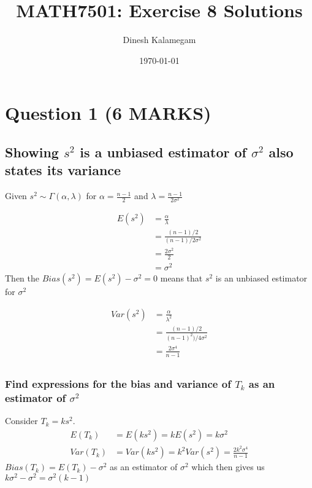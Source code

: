 \documentclass[11pt]{article}
\begin{document}
\title{MATH7501: Exercise 8 Solutions}
\author{Dinesh Kalamegam}
\date{\today}
\maketitle

\renewcommand\qedsymbol{\textbf{\emph{Quod Erat Demonstrandum}}}
\setlength{\parindent}{0pt}
\setlength{\parskip}{\baselineskip}
\newtheorem{theorem}{Theorem}[section]
\newtheorem{definition}[theorem]{Defintion}
\newtheorem{proposition}[theorem]{Proposition}
\newtheorem{corollary}[theorem]{Corollary}

\section{Question 1 (6 MARKS)}
\subsection{Showing $s^{2}$ is a unbiased estimator of $\sigma^{2}$ also states its variance}
Given $s^{2} \sim \Gamma(\alpha,\lambda)$ for $\alpha = \frac{n-1}{2}$ and $\lambda=\frac{n-1}{2\sigma^{2}}$

\begin{align*}
  E(s^{2}) &=  \frac{\alpha}{\lambda} \\
           &=  \frac{(n-1)/2}{(n-1)/2 \sigma^{2}} \\
           &=  \frac{2 \sigma^{2}}{2} \\
           &=  \boxed{\sigma^{2}}
\end{align*}
Then the $Bias(s^{2})=E(s^{2})-\sigma^{2}=0$ means that $s^{2}$ is an unbiased estimator for $\sigma^{2}$

\begin{align*}
  Var(s^{2}) &= \frac{\alpha}{\lambda^{2}} \\
             &= \frac{(n-1)/2}{(n-1)^{2})/4 \sigma^{2}} \\
             &= \boxed{\frac{2 \sigma^{4}}{n-1}}
\end{align*}
\subsection{}
\subsubsection{Find expressions for the bias and variance of $T_{k}$ as an estimator of $\sigma^{2}$}
Consider $T_{k} = ks^{2}$.
\begin{align*}
  E(T_{k})  &= E(ks^{2}) = kE(s^{2}) = k\sigma^{2} \\
  Var(T_{k}) &= Var(ks^{2}) = k^{2}Var(s^{2}) = \boxed{\frac{2k^{2}\sigma^{4}}{n-1}}
\end{align*}
$Bias(T_{k}) = E(T_{k}) - \sigma^{2}$ as an estimator of $\sigma^{2}$ which then gives us $k\sigma^{2}-\sigma^{2} = \boxed{\sigma^{2}(k-1)}$
\end{document}

